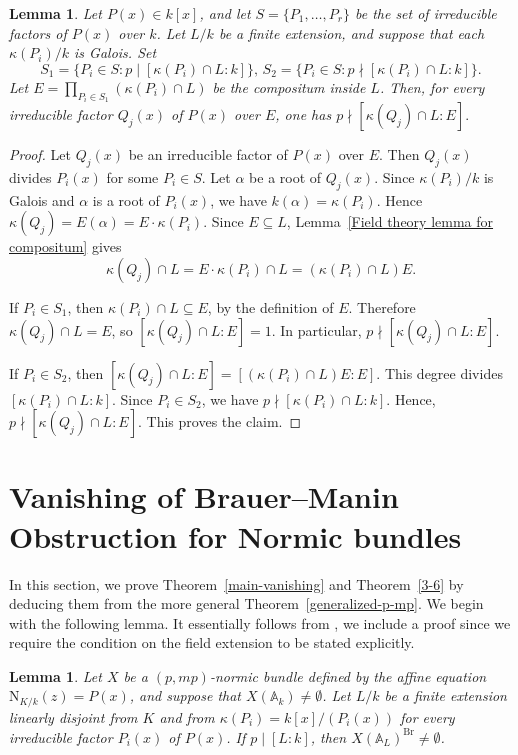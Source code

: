 \documentclass[10pt]{amsart}
\theoremstyle{plain}
\newtheorem{lemma}[thm]{Lemma}
\theoremstyle{definition}
\newcommand{\A}{{\mathbb A}}
\newcommand{\Nm}{\mathrm{N}}
\newcommand{\Br}{\operatorname{Br}}
\begin{document}
\begin{lemma}\label{base-change-factors-prime-to-p}
Let \(P(x)\in k[x]\), and let \(S=\{P_1,\dots,P_r\}\) be the set of irreducible factors of \(P(x)\) over \(k\). Let \(L/k\) be a finite extension, and suppose that each \(\kappa(P_i)/k\) is Galois. Set
$$S_1=\{P_i\in S : p\mid [\kappa(P_i)\cap L:k]\},\,
S_2=\{P_i\in S : p\nmid [\kappa(P_i)\cap L:k]\}.$$ Let
$E=\prod_{P_i\in S_1}(\kappa(P_i)\cap L)$ be the compositum inside \(L\). Then, for every irreducible factor \(Q_j(x)\) of \(P(x)\) over \(E\), one has
$p\nmid [\kappa(Q_j)\cap L:E].$
\end{lemma}
\begin{proof}
Let \(Q_j(x)\) be an irreducible factor of \(P(x)\) over \(E\). Then \(Q_j(x)\)
divides \(P_i(x)\) for some \(P_i\in S\). Let \(\alpha\) be a root of
\(Q_j(x)\). Since \(\kappa(P_i)/k\) is Galois and \(\alpha\) is a root of
\(P_i(x)\), we have \(k(\alpha)=\kappa(P_i)\). Hence \(\kappa(Q_j)=E(\alpha)=E\cdot\kappa(P_i)\). Since \(E\subseteq L\), Lemma~\ref{Field theory lemma for compositum} gives
$$\kappa(Q_j)\cap L=E\cdot\kappa(P_i)\cap L=(\kappa(P_i)\cap L)E.$$

If \(P_i\in S_1\), then \(\kappa(P_i)\cap L\subseteq E\), by the definition of
\(E\). Therefore \(\kappa(Q_j)\cap L=E\), so \([\kappa(Q_j)\cap L:E]=1\). In particular,
\(p\nmid [\kappa(Q_j)\cap L:E]\).

If \(P_i\in S_2\), then \([\kappa(Q_j)\cap L:E]= [(\kappa(P_i)\cap L)E:E]\). This degree divides \([\kappa(P_i)\cap L:k]\). Since \(P_i\in S_2\), we have \(p\nmid [\kappa(P_i)\cap L:k]\). Hence, \(p\nmid [\kappa(Q_j)\cap L:E]\). This proves the claim.
\end{proof}
\section{Vanishing of Brauer--Manin Obstruction for Normic bundles}
In this section, we prove Theorem~\ref{main-vanishing} and Theorem~\ref{3-6} by deducing them from the more general Theorem~\ref{generalized-p-mp}. We begin with the following lemma. It essentially  follows from \cite[Corollary~3.4]{CV}, we include a proof since we require the condition on the field extension to be stated explicitly.

\begin{lemma}\label{isomorphism in Brauer group}
Let $X$ be a $(p,mp)$-normic bundle defined by the affine equation $\Nm_{K/k}(z)=P(x)$, and suppose that $X(\A_k)\neq\emptyset$. Let $L/k$ be a finite extension linearly disjoint from $K$ and from $\kappa(P_i)=k[x]/(P_i(x))$ for every irreducible factor $P_i(x)$ of $P(x)$. If $p\mid [L:k]$, then $X(\A_L)^{\Br}\neq\emptyset$.
\end{lemma}
\end{document}
